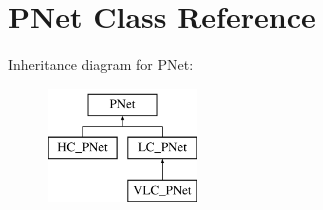 \hypertarget{class_p_net}{}\section{P\+Net Class Reference}
\label{class_p_net}
Inheritance diagram for P\+Net\+:\begin{figure}[H]
\begin{center}
\leavevmode
\includegraphics[height=3.000000cm]{class_p_net}
\end{center}
\end{figure}
